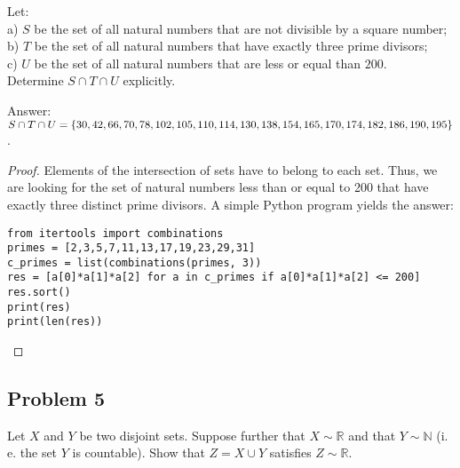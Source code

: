 \documentclass{article}
\newcommand{\R}{\mathbb{R}}
\newcommand{\N}{\mathbb{N}}
\DeclarePairedDelimiter{\set}{ \{ }{ \} }
\begin{document}
\begin{tcolorbox}
Let:\\
a) $S$ be the set of all natural numbers that are not divisible by a square number;\\
b) $T$ be the set of all natural numbers that have exactly three prime divisors;\\
c) $U$ be the set of all natural numbers that are less or equal than $200$.\\
Determine $S \cap T \cap U$ explicitly.
\end{tcolorbox}

Answer: $S \cap T \cap U 
= \set{ 30, 42, 66, 70, 78, 102, 105, 110, 114, 130, 138, 154, \\
165, 170, 174, 182,186, 190, 195 }$. 

\begin{proof}

Elements of the intersection of sets have to belong to each set.
Thus, we are looking for the set of natural numbers less than or equal to 200 that have exactly three distinct prime divisors.
A simple Python program yields the answer:

\begin{verbatim}
from itertools import combinations
primes = [2,3,5,7,11,13,17,19,23,29,31]
c_primes = list(combinations(primes, 3))
res = [a[0]*a[1]*a[2] for a in c_primes if a[0]*a[1]*a[2] <= 200]
res.sort()
print(res)
print(len(res))
\end{verbatim}

\end{proof}


\subsection*{Problem 5}

\begin{tcolorbox}
Let $X$ and $Y$ be two disjoint sets.
Suppose further that $X \sim \R$ and that $Y \sim \N$ (i.\,e. the set $Y$ is countable).
Show that $Z = X \cup Y$ satisfies $Z \sim \R$.
\end{tcolorbox}
\end{document}
